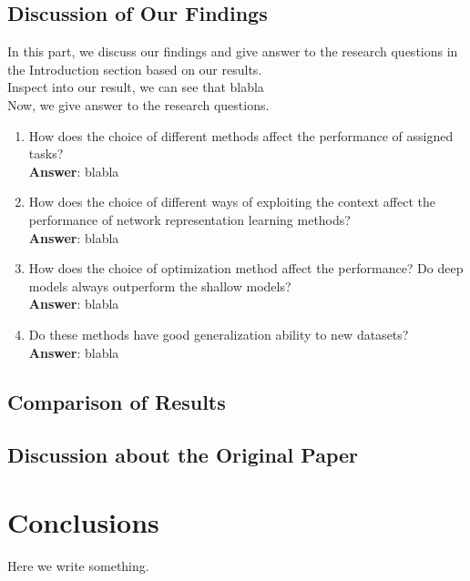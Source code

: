 \documentclass[a4paper]{article}
\begin{document}
\subsection{Discussion of Our Findings}

\noindent In this part, we discuss our findings and give answer to the research questions in the Introduction section based on our results.\\

\noindent Inspect into our result, we can see that blabla \\

\noindent Now, we give answer to the research questions.
\begin{enumerate}[1.]
\item How does the choice of different methods affect the performance of assigned tasks? \\
\textbf{Answer}: blabla

\item How does the choice of different ways of exploiting the context affect the performance of network representation learning methods?\\
\textbf{Answer}: blabla

\item How does the choice of optimization method affect the performance? Do deep models always outperform the shallow models?\\
\textbf{Answer}: blabla

\item Do these methods have good generalization ability to new datasets?\\
\textbf{Answer}: blabla

\end{enumerate}

\subsection{Comparison of Results}


\subsection{Discussion about the Original Paper}



\section{Conclusions}

\noindent Here we write something. 



\newpage
\printbibliography
\end{document}
